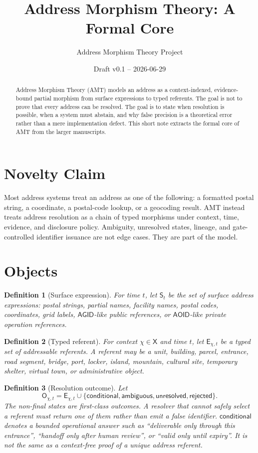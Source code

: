\documentclass[11pt]{article}
\title{Address Morphism Theory: A Formal Core}
\author{Address Morphism Theory Project}
\date{Draft v0.1 -- 2026-06-29}
\newtheorem{definition}{Definition}
\newcommand{\Surf}{\mathsf{S}}
\newcommand{\Ent}{\mathsf{E}}
\newcommand{\Out}{\mathsf{O}}
\newcommand{\Ctx}{\mathsf{X}}
\newcommand{\AGID}{\mathsf{AGID}}
\newcommand{\AOID}{\mathsf{AOID}}
\newcommand{\Ambiguous}{\mathsf{ambiguous}}
\newcommand{\Unresolved}{\mathsf{unresolved}}
\newcommand{\Rejected}{\mathsf{rejected}}
\newcommand{\Conditional}{\mathsf{conditional}}
\begin{document}
\maketitle

\begin{abstract}
Address Morphism Theory (AMT) models an address as a context-indexed,
evidence-bound partial morphism from surface expressions to typed referents.
The goal is not to prove that every address can be resolved. The goal is to
state when resolution is possible, when a system must abstain, and why false
precision is a theoretical error rather than a mere implementation defect.
This short note extracts the formal core of AMT from the larger manuscripts.
\end{abstract}

\section{Novelty Claim}

Most address systems treat an address as one of the following: a formatted
postal string, a coordinate, a postal-code lookup, or a geocoding result. AMT
instead treats address resolution as a chain of typed morphisms under context,
time, evidence, and disclosure policy. Ambiguity, unresolved states, lineage,
and gate-controlled identifier issuance are not edge cases. They are part of
the model.

\section{Objects}

\begin{definition}[Surface expression]
For time \(t\), let \(\Surf_t\) be the set of surface address expressions:
postal strings, partial names, facility names, postal codes, coordinates,
grid labels, \(\AGID\)-like public references, or \(\AOID\)-like private
operation references.
\end{definition}

\begin{definition}[Typed referent]
For context \(\chi \in \Ctx\) and time \(t\), let
\(\Ent_{\chi,t}\) be a typed set of addressable referents. A referent may be a
unit, building, parcel, entrance, road segment, bridge, port, locker, island,
mountain, cultural site, temporary shelter, virtual town, or administrative
object.
\end{definition}

\begin{definition}[Resolution outcome]
Let
\[
\Out_{\chi,t}
  = \Ent_{\chi,t}
    \cup \{\Conditional,\Ambiguous,\Unresolved,\Rejected\}.
\]
The non-final states are first-class outcomes. A resolver that cannot safely
select a referent must return one of them rather than emit a false identifier.
\(\Conditional\) denotes a bounded operational answer such as ``deliverable
only through this entrance'', ``handoff only after human review'', or
``valid only until expiry''. It is not the same as a context-free proof of a
unique address referent.
\end{definition}
\end{document}

